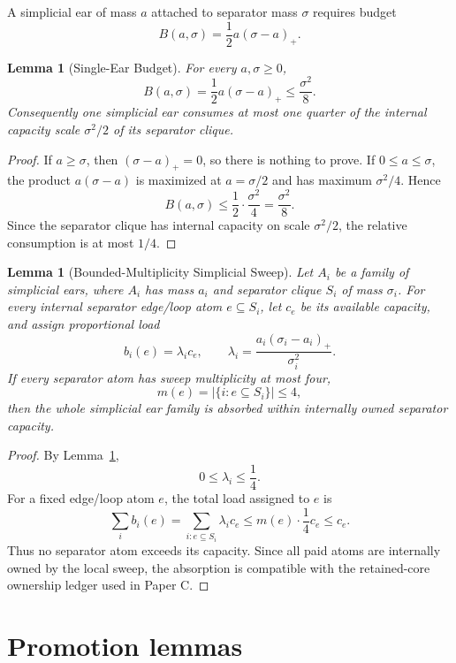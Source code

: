 \documentclass[11pt]{article}
\newtheorem{lemma}[theorem]{Lemma}
\theoremstyle{definition}
\begin{document}
A simplicial ear of mass \(a\) attached to separator mass \(\sigma\) requires budget
\[
    B(a,\sigma)=\frac12a(\sigma-a)_+.
\]

\begin{lemma}[Single-Ear Budget]
\label{lem:single-ear-budget}
For every \(a,\sigma\ge0\),
\[
    B(a,\sigma)
    =
    \frac12a(\sigma-a)_+
    \le
    \frac{\sigma^2}{8}.
\]
Consequently one simplicial ear consumes at most one quarter of the internal capacity scale \(\sigma^2/2\) of its separator clique.
\end{lemma}

\begin{proof}
If \(a\ge\sigma\), then \((\sigma-a)_+=0\), so there is nothing to prove. If \(0\le a\le\sigma\), the product \(a(\sigma-a)\) is maximized at \(a=\sigma/2\) and has maximum \(\sigma^2/4\). Hence
\[
    B(a,\sigma)
    \le
    \frac12\cdot\frac{\sigma^2}{4}
    =
    \frac{\sigma^2}{8}.
\]
Since the separator clique has internal capacity on scale \(\sigma^2/2\), the relative consumption is at most \(1/4\).
\end{proof}

\begin{lemma}[Bounded-Multiplicity Simplicial Sweep]
\label{lem:bounded-simplicial-sweep}
Let \(A_i\) be a family of simplicial ears, where \(A_i\) has mass \(a_i\) and separator clique \(S_i\) of mass \(\sigma_i\). For every internal separator edge/loop atom \(e\subseteq S_i\), let \(c_e\) be its available capacity, and assign proportional load
\[
    b_i(e)=\lambda_i c_e,
    \qquad
    \lambda_i=
    \frac{a_i(\sigma_i-a_i)_+}{\sigma_i^2}.
\]
If every separator atom has sweep multiplicity at most four,
\[
    m(e)=|\{i:e\subseteq S_i\}|\le4,
\]
then the whole simplicial ear family is absorbed within internally owned separator capacity.
\end{lemma}

\begin{proof}
By Lemma~\ref{lem:single-ear-budget},
\[
    0\le\lambda_i\le\frac14.
\]
For a fixed edge/loop atom \(e\), the total load assigned to \(e\) is
\[
    \sum_i b_i(e)
    =
    \sum_{i:e\subseteq S_i}\lambda_i c_e
    \le
    m(e)\cdot\frac14 c_e
    \le
    c_e.
\]
Thus no separator atom exceeds its capacity. Since all paid atoms are internally owned by the local sweep, the absorption is compatible with the retained-core ownership ledger used in Paper C.
\end{proof}

\section{Promotion lemmas}
\end{document}
